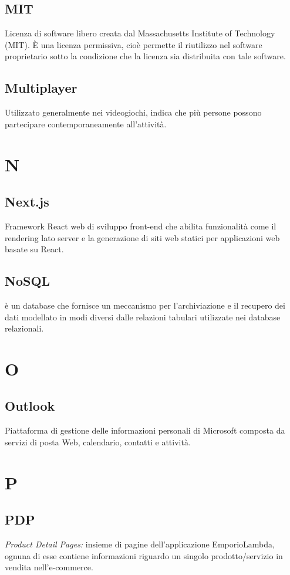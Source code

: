 \subsection*{MIT}
Licenza di software libero creata dal Massachusetts Institute of Technology (MIT). È una licenza permissiva, cioè permette il riutilizzo nel software proprietario sotto la condizione che la licenza sia distribuita con tale software.

\subsection*{Multiplayer}
Utilizzato generalmente nei videogiochi, indica che più persone possono partecipare contemporaneamente all'attività.

\newpage
\section{N}
\subsection*{Next.js}
Framework React web di sviluppo front-end che abilita funzionalità come il rendering lato server e la generazione di siti web statici per applicazioni web basate su React.

\subsection*{NoSQL}
è un database che fornisce un meccanismo per l'archiviazione e il recupero dei dati modellato in modi diversi dalle relazioni tabulari utilizzate nei database relazionali.
\newpage
\section{O}
\subsection*{Outlook}
Piattaforma di gestione delle informazioni personali di Microsoft composta da servizi di posta Web, calendario, contatti e attività.

\newpage
\section{P}
\subsection*{PDP}
\textit{Product Detail Pages:} insieme di pagine dell'applicazione EmporioLambda, ognuna di esse contiene informazioni riguardo un singolo prodotto/servizio in vendita nell'e-commerce.

